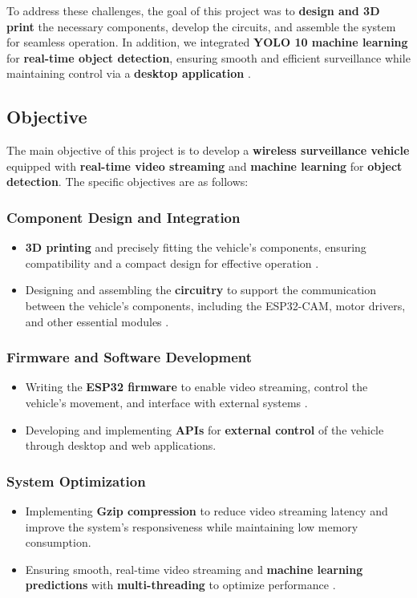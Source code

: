 \documentclass[12pt,a4paper]{report}
\begin{document}
To address these challenges, the goal of this project was to \textbf{design and 3D print} the necessary components, develop the circuits, and assemble the system for seamless operation. In addition, we integrated \textbf{YOLO 10 machine learning} for \textbf{real-time object detection}, ensuring smooth and efficient surveillance while maintaining control via a \textbf{desktop application} \cite{yolov10}.


\label{Objective}  
\subsection{Objective}  

The main objective of this project is to develop a \textbf{wireless surveillance vehicle} equipped with \textbf{real-time video streaming} and \textbf{machine learning} for \textbf{object detection}. The specific objectives are as follows:  

\subsubsection*{Component Design and Integration}  
\begin{itemize}  
    \item \textbf{3D printing} and precisely fitting the vehicle's components, ensuring compatibility and a compact design for effective operation \cite{3dprinting}.  
    \item Designing and assembling the \textbf{circuitry} to support the communication between the vehicle's components, including the ESP32-CAM, motor drivers, and other essential modules \cite{circuitdesign}.  
\end{itemize}  

\subsubsection*{Firmware and Software Development}  
\begin{itemize}  
    \item Writing the \textbf{ESP32 firmware} to enable video streaming, control the vehicle's movement, and interface with external systems \cite{esp32cam}.  
    \item Developing and implementing \textbf{APIs} for \textbf{external control} of the vehicle through desktop and web applications.  
\end{itemize}  

\subsubsection*{System Optimization}  
\begin{itemize}  
    \item Implementing \textbf{Gzip compression} to reduce video streaming latency and improve the system's responsiveness while maintaining low memory consumption.  
    \item Ensuring smooth, real-time video streaming and \textbf{machine learning predictions} with \textbf{multi-threading} to optimize performance \cite{homl}.  
\end{itemize}  
\end{document}
